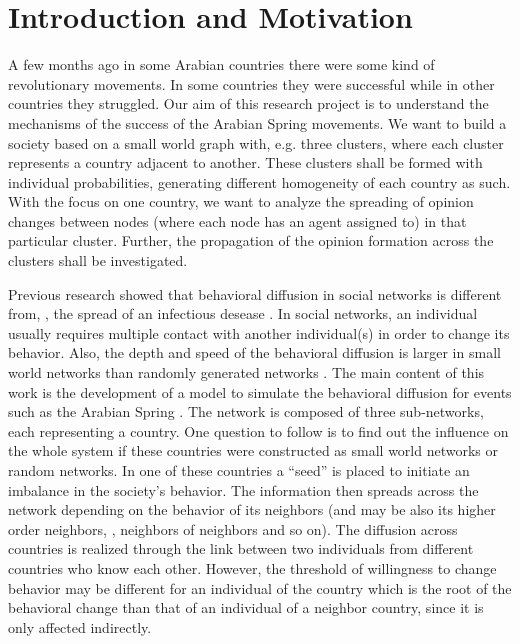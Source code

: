 
\section{Introduction and Motivation}
\label{sec:introAndMotivation}

A few months ago in some Arabian countries there were some kind of
revolutionary movements. In some countries they were successful while in other
countries they struggled. Our aim of this research project is to understand the
mechanisms of the success of the Arabian Spring movements.  We want to build a
society based on a small world graph with, e.g. three clusters, where each
cluster represents a country adjacent to another. These clusters shall be
formed with individual probabilities, generating different homogeneity of each
country as such. With the focus on one country, we want to analyze the
spreading of opinion changes between nodes (where each node has an agent
assigned to) in that particular cluster. Further, the propagation of the
opinion formation across the clusters shall be investigated.

Previous research showed that behavioral diffusion in social networks is
different from, \eg, the spread of an infectious desease
\cite{centola2010spread}.  In social networks, an individual usually requires
multiple contact with another individual(s) in order to change its behavior.
Also, the depth and speed of the behavioral diffusion is larger in small world
networks than randomly generated networks \cite{centola2010spread}.  The main
content of this work is the development of a model to simulate the behavioral
diffusion for events such as the Arabian Spring \cite{timeLineArabSpring}.  The
network is composed of three sub-networks, each representing a country.  One
question to follow is to find out the influence on the whole system if these
countries were constructed as small world networks or random networks.  In one
of these countries a ``seed'' is placed to initiate an imbalance in the
society's behavior.  The information then spreads across the network depending
on the behavior of its neighbors (and may be also its higher order neighbors,
\ie, neighbors of neighbors and so on).  The diffusion across countries is
realized through the link between two individuals from different countries who
know each other.  However, the threshold of willingness to change behavior may
be different for an individual of the country which is the root of the
behavioral change than that of an individual of a neighbor country, since it is
only affected indirectly.

